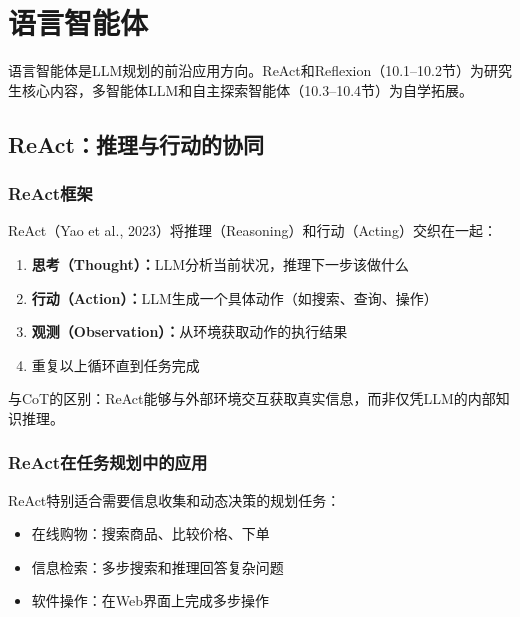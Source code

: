 \chapter{语言智能体 \grad}

\begin{levelbox}
语言智能体是LLM规划的前沿应用方向。ReAct和Reflexion（10.1--10.2节）为研究生核心内容，多智能体LLM和自主探索智能体（10.3--10.4节）为自学拓展。
\end{levelbox}

\section{ReAct：推理与行动的协同 \grad}

\subsection{ReAct框架}

ReAct（Yao et al., 2023）将推理（Reasoning）和行动（Acting）交织在一起：

\begin{algbox}[title={\textbf{ReAct循环}}]
\begin{enumerate}
  \item \textbf{思考（Thought）：}LLM分析当前状况，推理下一步该做什么
  \item \textbf{行动（Action）：}LLM生成一个具体动作（如搜索、查询、操作）
  \item \textbf{观测（Observation）：}从环境获取动作的执行结果
  \item 重复以上循环直到任务完成
\end{enumerate}
与CoT的区别：ReAct能够与外部环境交互获取真实信息，而非仅凭LLM的内部知识推理。
\end{algbox}

\subsection{ReAct在任务规划中的应用}

ReAct特别适合需要信息收集和动态决策的规划任务：
\begin{itemize}
  \item 在线购物：搜索商品、比较价格、下单
  \item 信息检索：多步搜索和推理回答复杂问题
  \item 软件操作：在Web界面上完成多步操作
\end{itemize}

